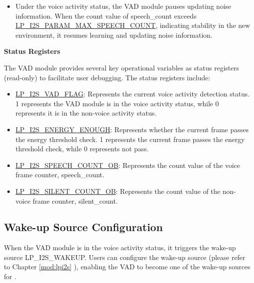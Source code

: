 \documentclass[main\_\_EN.tex]{subfiles}
\begin{document}
\begin{itemize}
\begin{itemize}
\begin{itemize}
            \item If the count value of speech\_count is less than or equal to \hyperref[fielddesc:LPI2SPARAMMINSPEECHCOUNT]{LP\_I2S\_PARAM\_MIN\_SPEECH\_COUNT}, the VAD module transitions directly to the non-voice activity status and resets speech\_count to 0.
        \end{itemize}
        \item Under the voice activity status, the VAD module pauses updating noise information. When the count value of speech\_count exceeds \hyperref[fielddesc:LPI2SPARAMMAXSPEECHCOUNT]{LP\_I2S\_PARAM\_MAX\_SPEECH\_COUNT}, indicating stability in the new environment, it resumes learning and updating noise information.
    \end{itemize}
\end{itemize}


\textbf{Status Registers}

The VAD module provides several key operational variables as status registers (read-only) to facilitate user debugging. The status registers include:
\begin{itemize}
    \item \hyperref[fielddesc:LPI2SVADFLAG]{LP\_I2S\_VAD\_FLAG}: Represents the current voice activity detection status. 1 represents the VAD module is in the voice activity status, while 0 represents it is in the non-voice activity status.
    \item \hyperref[fielddesc:LPI2SENERGYENOUGH]{LP\_I2S\_ENERGY\_ENOUGH}: Represents whether the current frame passes the energy threshold check. 1 represents the current frame passes the energy threshold check, while 0 represents not pass.
    \item \hyperref[fielddesc:LPI2SSPEECHCOUNTOB]{LP\_I2S\_SPEECH\_COUNT\_OB}: Represents the count value of the voice frame counter, speech\_count.
    \item \hyperref[fielddesc:LPI2SSILENTCOUNTOB]{LP\_I2S\_SILENT\_COUNT\_OB}: Represents the count value of the non-voice frame counter, silent\_count.
\end{itemize}


\subsection{Wake-up Source Configuration}

When the VAD module is in the voice activity status, it triggers the wake-up source LP\_I2S\_WAKEUP. Users can configure the wake-up source (please refer to Chapter \ref{mod:lpi2s} \textit{}), enabling the VAD to become one of the wake-up sources for \chipname{}.
\end{document}
